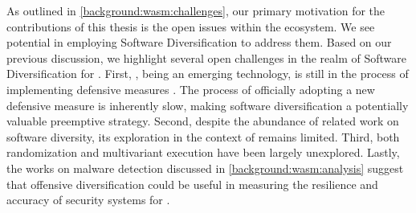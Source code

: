 \label{sota:openchallenges}
As outlined in \autoref{background:wasm:challenges}, our primary motivation for the contributions of this thesis is the open issues within the \Wasm ecosystem. 
We see potential in employing Software Diversification to address them. 
Based on our previous discussion, we highlight several open challenges in the realm of Software Diversification for \Wasm. 
First, \Wasm, being an emerging technology, is still in the process of implementing defensive measures \cite{Stevienart paper here}. 
The process of officially adopting a new defensive measure is inherently slow, making software diversification a potentially valuable preemptive strategy. 
Second, despite the abundance of related work on software diversity, its exploration in the context of \Wasm remains limited. 
Third, both randomization and multivariant execution have been largely unexplored. 
Lastly, the works on malware detection discussed in \autoref{background:wasm:analysis} suggest that offensive diversification could be useful in measuring the resilience and accuracy of security systems for \Wasm.






